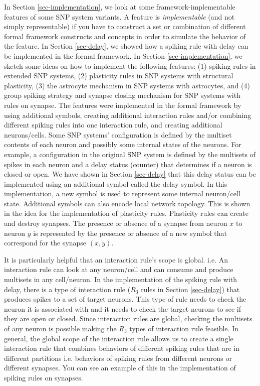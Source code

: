 \documentclass[a4paper]{article}
\theoremstyle{definition}
\begin{document}
In Section \ref{sec-implementation}, we look at some framework-implementable features of some SNP
system variants. A feature is \emph{implementable} (and not simply representable) if you have to
construct a set or combination of different formal framework constructs and concepts in order to 
simulate the behavior of the feature. In Section \ref{sec-delay}, we showed how a spiking rule with
delay can be implemented in the formal framework. In Section \ref{sec-implementation}, we sketch
some ideas on how to implement the following features: (1) spiking rules in extended SNP systems,
(2) plasticity rules in SNP systems with structural plasticity, (3) the astrocyte mechanism in
SNP systems with astrocytes, and (4) group spiking strategy and synapse closing mechanism for SNP
systems with rules on synapse. The features were implemented in the formal framework by using 
additional symbols, creating additional interaction rules and/or combining different spiking rules
into one interaction rule, and creating additional neurons/cells. Some SNP systems' configuration is 
defined by the multiset contents of each neuron and possibly some internal states of the neurons. 
For example, a configuration in the original SNP system is defined by the multisets of spikes in 
each neuron and a delay status (counter) that determines if a neuron is closed or open. We have 
shown in Section \ref{sec-delay} that this delay status can be implemented using an additional 
symbol called the delay symbol. In this implementation, a new symbol is used to represent some 
internal neuron/cell state. Additional symbols can also encode local network topology. This is 
shown in the idea for the implementation of plasticity rules. Plasticity rules can create and 
destroy synapses. The presence or absence of a synapse from neuron $x$ to neuron $y$ is represented 
by the presence or absence of a new symbol that correspond for the synapse $(x,y)$.

It is particularly helpful that an interaction rule's scope is global. i.e. An interaction rule can 
look at any neuron/cell and can consume and produce multisets in any cell/neuron. In the 
implementation of the spiking rule with delay, there is a type of interaction rule ($R_3$ rules in
Section \ref{sec-delay}) that produces spikes to a set of target neurons. This type of rule needs
to check the neuron it is associated with and it needs to check the target neurons to see if they
are open or closed. Since interaction rules are global, checking the multisets of any neuron is 
possible making the $R_3$ types of interaction rule feasible. In general, the global scope of the
interaction rule allows us to create a single interaction rule that  combines behaviors of different 
spiking rules that are in different partitions i.e. behaviors of spiking rules from different 
neurons or different synapses. You can see an example of this in the implementation of spiking
rules on synapses.
\end{document}
